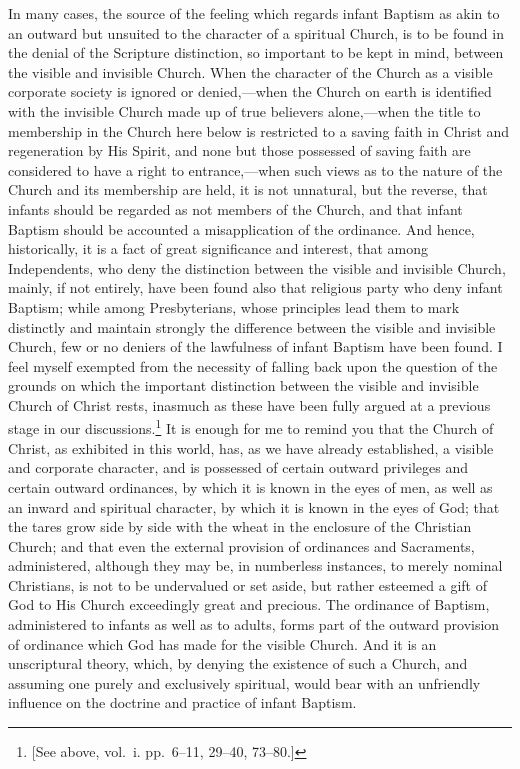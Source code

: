 \documentclass[
  english,
]{book}
\begin{document}
In many cases, the source of the feeling which regards infant Baptism as akin to an outward but unsuited to the character of a spiritual Church, is to be found in the denial of the Scripture distinction, so important to be kept in mind, between the visible and invisible Church. When the character of the Church as a visible corporate society is ignored or denied,---when the Church on earth is identified with the invisible Church made up of true believers alone,---when the title to membership in the Church here below is restricted to a saving faith in Christ and regeneration by His Spirit, and none but those possessed of saving faith are considered to have a right to entrance,---when such views as to the nature of the Church and its membership are held, it is not unnatural, but the reverse, that infants should be regarded as not members of the Church, and that infant Baptism should be accounted a misapplication of the ordinance. And hence, historically, it is a fact of great significance and interest, that among Independents, who deny the distinction between the visible and invisible Church, mainly, if not entirely, have been found also that religious party who deny infant Baptism; while among Presbyterians, whose principles lead them to mark distinctly and maintain strongly the difference between the visible and invisible Church, few or no deniers of the lawfulness of infant Baptism have been found. I feel myself exempted from the necessity of falling back upon the question of the grounds on which the important distinction between the visible and invisible Church of Christ rests, inasmuch as these have been fully argued at a previous stage in our discussions.\footnote{{[}See above, vol.~i. pp.~6--11, 29--40, 73--80.{]}} It is enough for me to remind you that the Church of Christ, as exhibited in this world, has, as we have already established, a visible and corporate character, and is possessed of certain outward privileges and certain outward ordinances, by which it is known in the eyes of men, as well as an inward and spiritual character, by which it is known in the eyes of God; that the tares grow side by side with the wheat in the enclosure of the Christian Church; and that even the external provision of ordinances and Sacraments, administered, although they may be, in numberless instances, to merely nominal Christians, is not to be undervalued or set aside, but rather esteemed a gift of God to His Church exceedingly great and precious. The ordinance of Baptism, administered to infants as well as to adults, forms part of the outward provision of ordinance which God has made for the visible Church. And it is an unscriptural theory, which, by denying the existence of such a Church, and assuming one purely and exclusively spiritual, would bear with an unfriendly influence on the doctrine and practice of infant Baptism.
\end{document}
